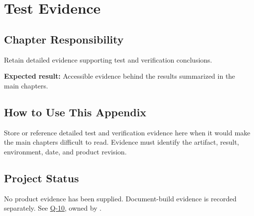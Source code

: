 \chapter{Test Evidence}
\section{Chapter Responsibility}
\label{Section:TestEvidenceResponsibility}
Retain detailed evidence supporting test and verification conclusions.

\noindent\textbf{Expected result:} Accessible evidence behind the results summarized in the main chapters.

\section{How to Use This Appendix}
Store or reference detailed test and verification evidence here when it would make the main chapters difficult to read. Evidence must identify the artifact, result, environment, date, and product revision.

\section{Project Status}
No product evidence has been supplied. Document-build evidence is recorded separately.
See \hyperref[Question:Q-10]{Q-10}, owned by \DocumentOwner.
